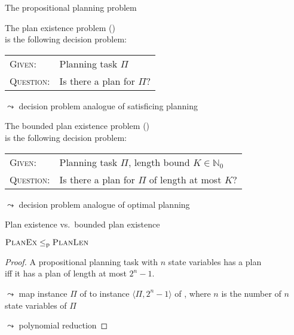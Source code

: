 \documentclass{gkibeamer}
\begin{document}
\begin{frame}{The propositional planning problem}
  \begin{definition}
    The \alert{plan existence} problem (\planex) \\
    is the following decision problem:
    \smallskip

    \begin{tabular}{@{}ll}
      \textsc{Given:} &
      Planning task $\Pi$ \\
      \textsc{Question:} &
      Is there a plan for $\Pi$?
    \end{tabular}
  \end{definition}
  $\leadsto$ decision problem analogue of \alert{satisficing planning}

  \medskip

  \begin{definition}
    The \alert{bounded plan existence} problem (\planlen) \\
    is the following decision problem:
    \smallskip

    \begin{tabular}{@{}ll}
      \textsc{Given:} &
      Planning task $\Pi$, length bound $K \in \mathbb N_0$ \\
      \textsc{Question:} &
      Is there a plan for $\Pi$ of length at most $K$?
    \end{tabular}
  \end{definition}
  $\leadsto$ decision problem analogue of \alert{optimal planning}
\end{frame}

\begin{frame}{Plan existence vs.\ bounded plan existence}
  \begin{theorem}
    $\textsc{PlanEx} \le_{\text{p}} \textsc{PlanLen}$
  \end{theorem}

  \begin{proof}
    A propositional planning task with $n$ state variables has a plan
    \\ iff it has a plan of length at most $2^n - 1$.

    \smallskip

    $\leadsto$ map instance $\Pi$ of {\planex}
    to instance $\langle \Pi, 2^n - 1\rangle$ of {\planlen}, where $n$
    is the number of $n$ state variables of $\Pi$

    \smallskip

    $\leadsto$ polynomial reduction
  \end{proof}
\end{frame}
\end{document}
